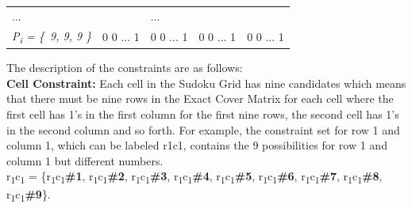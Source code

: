 \documentclass[a4paper,oneside,11pt]{report}
\begin{document}
\begin{tabular}{m{2.5cm} m{3cm} m{3cm} m{3cm} m{3cm}}
\hspace{0.7cm}... & &\hspace{2cm} ... & & \\
{\itshape P\textsubscript{i} = \{\ 9, 9, 9 \}} & 0\hspace{0.5cm} 0\hspace{0.5cm} ... \hspace{0.2cm} 1 & 0\hspace{0.5cm} 0\hspace{0.3cm} ... \hspace{0.5cm} 1 & 0\hspace{0.7cm} 0\hspace{0.5cm} ... \hspace{0.3cm} 1 & 0\hspace{0.7cm} 0\hspace{0.5cm} ... \hspace{0.3cm} 1\\ 
\end{tabular}
\newline
\newline

The description of the constraints are as follows:\\

\textbf{Cell Constraint:} Each cell in the Sudoku Grid has nine candidates which means that there must be nine rows in the Exact Cover Matrix for each cell where the first cell has 1’s in the first column for the first nine rows, the second cell has 1’s in the second column and so forth.  For example, the constraint set for row 1 and column 1, which can be labeled r1c1, contains the 9 possibilities for row 1 and column 1 but different numbers.\\
r\textsubscript{1}c\textsubscript{1} = \{r\textsubscript{1}c\textsubscript{1}\textbf{\#1}, r\textsubscript{1}c\textsubscript{1}\textbf{\#2}, r\textsubscript{1}c\textsubscript{1}\textbf{\#3}, r\textsubscript{1}c\textsubscript{1}\textbf{\#4}, r\textsubscript{1}c\textsubscript{1}\textbf{\#5}, r\textsubscript{1}c\textsubscript{1}\textbf{\#6}, r\textsubscript{1}c\textsubscript{1}\textbf{\#7}, r\textsubscript{1}c\textsubscript{1}\textbf{\#8}, r\textsubscript{1}c\textsubscript{1}\textbf{\#9}\}.\\
\end{document}
